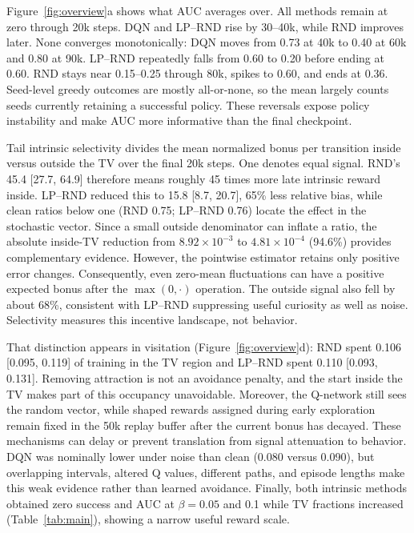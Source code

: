 \documentclass{article}
\newcommand{\lprnd}{LP--RND}
\begin{document}
Figure~\ref{fig:overview}a shows what AUC averages over. All methods remain at
zero through 20k steps. DQN and \lprnd{} rise by 30--40k, while RND improves
later. None converges monotonically: DQN moves from 0.73 at 40k to 0.40 at
60k and 0.80 at 90k. \lprnd{} repeatedly falls from 0.60 to 0.20 before ending
at 0.60. RND stays near 0.15--0.25 through 80k, spikes to 0.60, and ends at
0.36. Seed-level greedy outcomes are mostly all-or-none, so the mean largely
counts seeds currently retaining a successful policy. These reversals expose
policy instability and make AUC more informative than the final checkpoint.


Tail intrinsic selectivity divides the mean normalized bonus per transition
inside versus outside the TV over the final 20k steps. One denotes equal
signal. RND's 45.4 [27.7, 64.9] therefore means roughly 45 times more late
intrinsic reward inside. \lprnd{} reduced this to 15.8 [8.7, 20.7], 65\% less
relative bias, while clean ratios below one (RND 0.75; \lprnd{} 0.76) locate
the effect in the stochastic vector. Since a small outside denominator can
inflate a ratio, the absolute inside-TV reduction from
$8.92\times10^{-3}$ to $4.81\times10^{-4}$ (94.6\%) provides complementary
evidence. However, the pointwise estimator retains only positive error
changes. Consequently, even zero-mean fluctuations can have a positive
expected bonus after the $\max(0,\cdot)$ operation. The outside signal also
fell by about 68\%, consistent with \lprnd{} suppressing useful curiosity as
well as noise. Selectivity measures this incentive landscape, not behavior.

That distinction appears in visitation (Figure~\ref{fig:overview}d): RND spent
0.106 [0.095, 0.119] of training in the TV region and \lprnd{} spent 0.110
[0.093, 0.131]. Removing attraction is not an avoidance penalty, and the
start inside the TV makes part of this occupancy unavoidable. Moreover, the
Q-network still sees the random vector, while shaped rewards assigned during
early exploration remain fixed in the 50k replay buffer after the current
bonus has decayed. These mechanisms can delay or prevent translation from
signal attenuation to behavior. DQN was nominally lower under noise than
clean (0.080 versus 0.090), but overlapping intervals, altered Q values,
different paths, and episode lengths make this weak evidence rather than
learned avoidance. Finally, both intrinsic methods obtained zero success and
AUC at $\beta=0.05$ and 0.1 while TV fractions increased
(Table~\ref{tab:main}), showing a narrow useful reward scale.
\end{document}
